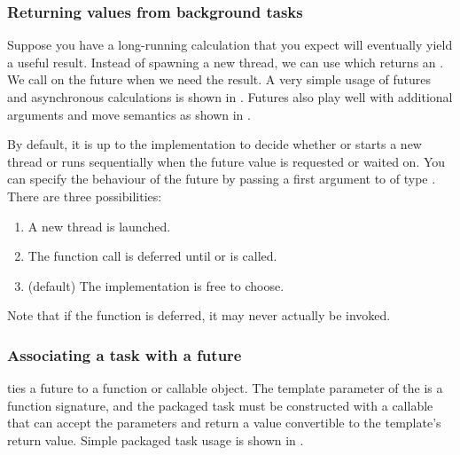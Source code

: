 \subsubsection{Returning values from background tasks}
Suppose you have a long-running calculation that you expect will eventually yield a useful result. Instead of spawning a new thread, we can use  which returns an . We call  on the future when we need the result. A very simple usage of futures and asynchronous calculations is shown in . Futures also play well with additional arguments and move semantics as shown in .


By default, it is up to the implementation to decide whether or  starts a new thread or runs sequentially when the future value is requested or waited on. You can specify the behaviour of the future by passing a first argument to  of type . There are three possibilities:
\begin{enumerate}
  \item {} A new thread is launched.
  \item {} The function call is deferred until  or  is called. 
  \item {} (default) The implementation is free to choose.
\end{enumerate}
Note that if the function is deferred, it may never actually be invoked.

\subsubsection{Associating a task with a future}
 ties a future to a function or callable object. The template parameter of the  is a function signature, and the packaged task must be constructed with a callable that can accept the parameters and return a value convertible to the template's return value. Simple packaged task usage is shown in .


